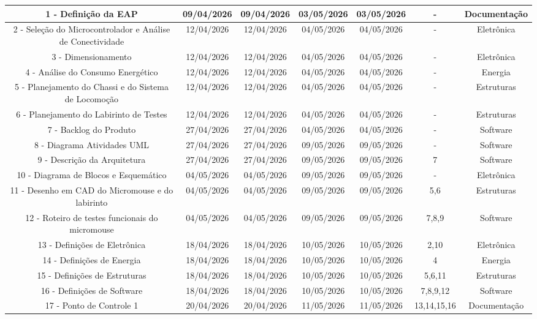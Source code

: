 \begin{landscape}
\begin{table}[htpb]
{\begin{tabular}{|c|c|c|c|c|c|c|}
1 - Definição da EAP & 09/04/2026 & 09/04/2026 & 03/05/2026 & 03/05/2026 & - & Documentação \\ \hline
2 - Seleção do Microcontrolador e Análise de Conectividade & 12/04/2026 & 12/04/2026 & 04/05/2026 & 04/05/2026 & - & Eletrônica \\ \hline
3 - Dimensionamento & 12/04/2026 & 12/04/2026 & 04/05/2026 & 04/05/2026 & - & Eletrônica \\ \hline
4 - Análise do Consumo Energético & 12/04/2026 & 12/04/2026 & 04/05/2026 & 04/05/2026 & - & Energia \\ \hline
5 - Planejamento do Chassi e do Sistema de Locomoção & 12/04/2026 & 12/04/2026 & 04/05/2026 & 04/05/2026 & - & Estruturas \\ \hline
6 - Planejamento do Labirinto de Testes & 12/04/2026 & 12/04/2026 & 04/05/2026 & 04/05/2026 & - & Estruturas \\ \hline
7 - Backlog do Produto & 27/04/2026 & 27/04/2026 & 04/05/2026 & 04/05/2026 & - & Software \\ \hline
8 - Diagrama Atividades UML & 27/04/2026 & 27/04/2026 & 09/05/2026 & 09/05/2026 & - & Software \\ \hline
9 - Descrição da Arquitetura & 27/04/2026 & 27/04/2026 & 09/05/2026 & 09/05/2026 & 7 & Software \\ \hline
10 - Diagrama de Blocos e Esquemático & 04/05/2026 & 04/05/2026 & 09/05/2026 & 09/05/2026 & - & Eletrônica \\ \hline
11 - Desenho em CAD do Micromouse e do labirinto & 04/05/2026 & 04/05/2026 & 09/05/2026 & 09/05/2026 & 5,6 & Estruturas \\ \hline
12 - Roteiro de testes funcionais do micromouse & 04/05/2026 & 04/05/2026 & 09/05/2026 & 09/05/2026 & 7,8,9 & Software \\ \hline
13 - Definições de Eletrônica & 18/04/2026 & 18/04/2026 & 10/05/2026 & 10/05/2026 & 2,10 & Eletrônica \\ \hline
14 - Definições de Energia & 18/04/2026 & 18/04/2026 & 10/05/2026 & 10/05/2026 & 4 & Energia \\ \hline
15 - Definições de Estruturas & 18/04/2026 & 18/04/2026 & 10/05/2026 & 10/05/2026 & 5,6,11 & Estruturas \\ \hline
16 - Definições de Software & 18/04/2026 & 18/04/2026 & 10/05/2026 & 10/05/2026 & 7,8,9,12 & Software \\ \hline
17 - Ponto de Controle 1 & 20/04/2026 & 20/04/2026 & 11/05/2026 & 11/05/2026 & 13,14,15,16 & Documentação \\ \hline


\end{tabular}}
\end{table}
\end{landscape}
